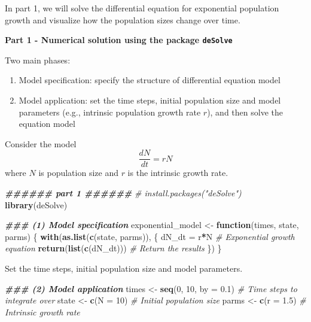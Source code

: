 \documentclass[
]{book}
\newenvironment{Shaded}{\begin{snugshade}}{\end{snugshade}}
\newcommand{\AttributeTok}[1]{\textcolor[rgb]{0.13,0.29,0.53}{#1}}
\newcommand{\CommentTok}[1]{\textcolor[rgb]{0.56,0.35,0.01}{\textit{#1}}}
\newcommand{\ControlFlowTok}[1]{\textcolor[rgb]{0.13,0.29,0.53}{\textbf{#1}}}
\newcommand{\DecValTok}[1]{\textcolor[rgb]{0.00,0.00,0.81}{#1}}
\newcommand{\DocumentationTok}[1]{\textcolor[rgb]{0.56,0.35,0.01}{\textbf{\textit{#1}}}}
\newcommand{\FloatTok}[1]{\textcolor[rgb]{0.00,0.00,0.81}{#1}}
\newcommand{\FunctionTok}[1]{\textcolor[rgb]{0.13,0.29,0.53}{\textbf{#1}}}
\newcommand{\NormalTok}[1]{#1}
\newcommand{\OtherTok}[1]{\textcolor[rgb]{0.56,0.35,0.01}{#1}}
\newcommand{\SpecialCharTok}[1]{\textcolor[rgb]{0.81,0.36,0.00}{\textbf{#1}}}
\begin{document}
In part 1, we will solve the differential equation for exponential population growth and visualize how the population sizes change over time.

\textbf{Part 1 - Numerical solution using the package \texttt{deSolve}}

Two main phases:

\begin{enumerate}
\def\labelenumi{(\arabic{enumi})}
\item
  Model specification: specify the structure of differential equation model
\item
  Model application: set the time steps, initial population size and model parameters (e.g., intrinsic population growth rate \(r\)), and then solve the equation model
\end{enumerate}

Consider the model
\[
\frac{dN}{dt} = rN
\]
where \(N\) is population size and \(r\) is the intrinsic growth rate.

\begin{Shaded}
\begin{Highlighting}[]
\DocumentationTok{\#\#\#\#\#\# part 1 \#\#\#\#\#\#}
\CommentTok{\# install.packages("deSolve")}
\FunctionTok{library}\NormalTok{(deSolve)}

\DocumentationTok{\#\#\# (1) Model specification}
\NormalTok{exponential\_model }\OtherTok{\textless{}{-}} \ControlFlowTok{function}\NormalTok{(times, state, parms) \{}
  \FunctionTok{with}\NormalTok{(}\FunctionTok{as.list}\NormalTok{(}\FunctionTok{c}\NormalTok{(state, parms)), \{}
\NormalTok{    dN\_dt }\OtherTok{=}\NormalTok{ r}\SpecialCharTok{*}\NormalTok{N  }\CommentTok{\# Exponential growth equation}
    \FunctionTok{return}\NormalTok{(}\FunctionTok{list}\NormalTok{(}\FunctionTok{c}\NormalTok{(dN\_dt)))  }\CommentTok{\# Return the results}
\NormalTok{  \})}
\NormalTok{\}}
\end{Highlighting}
\end{Shaded}

Set the time steps, initial population size and model parameters.

\begin{Shaded}
\begin{Highlighting}[]
\DocumentationTok{\#\#\# (2) Model application}
\NormalTok{times }\OtherTok{\textless{}{-}} \FunctionTok{seq}\NormalTok{(}\DecValTok{0}\NormalTok{, }\DecValTok{10}\NormalTok{, }\AttributeTok{by =} \FloatTok{0.1}\NormalTok{)  }\CommentTok{\# Time steps to integrate over}
\NormalTok{state }\OtherTok{\textless{}{-}} \FunctionTok{c}\NormalTok{(}\AttributeTok{N =} \DecValTok{10}\NormalTok{)  }\CommentTok{\# Initial population size}
\NormalTok{parms }\OtherTok{\textless{}{-}} \FunctionTok{c}\NormalTok{(}\AttributeTok{r =} \FloatTok{1.5}\NormalTok{)  }\CommentTok{\# Intrinsic growth rate}
\end{Highlighting}
\end{Shaded}
\end{document}
